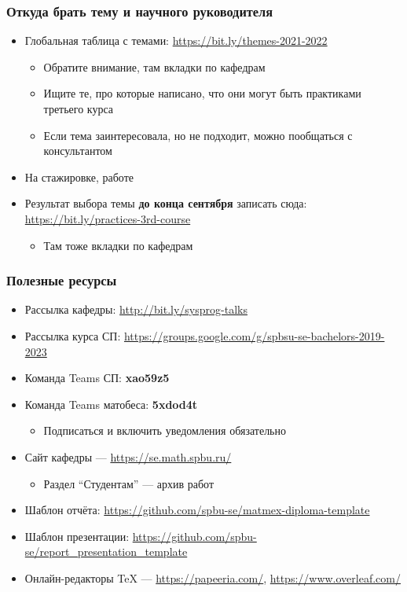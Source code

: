 \documentclass[xetex,mathserif,serif]{beamer}
\begin{document}
    \begin{frame}
        \frametitle{Откуда брать тему и научного руководителя}
        \begin{itemize}
            \item Глобальная таблица с темами: \url{https://bit.ly/themes-2021-2022}
            \begin{itemize}
                \item Обратите внимание, там вкладки по кафедрам
                \item Ищите те, про которые написано, что они могут быть практиками третьего курса
                \item Если тема заинтересовала, но не подходит, можно пообщаться с консультантом
            \end{itemize}
            \item На стажировке, работе
            \item Результат выбора темы \textbf{до конца сентября} записать сюда: \url{https://bit.ly/practices-3rd-course}
            \begin{itemize}
                \item Там тоже вкладки по кафедрам
            \end{itemize}
        \end{itemize}
    \end{frame}

    \begin{frame}
        \frametitle{Полезные ресурсы}
        \begin{itemize}
            \item Рассылка кафедры: \url{http://bit.ly/sysprog-talks}
            \item Рассылка курса СП: \url{https://groups.google.com/g/spbsu-se-bachelors-2019-2023}
            \item Команда Teams СП: \textbf{xao59z5}
            \item Команда Teams матобеса: \textbf{5xdod4t}
            \begin{itemize}
                \item Подписаться и включить уведомления обязательно
            \end{itemize}
            \item Сайт кафедры --- \url{https://se.math.spbu.ru/}
            \begin{itemize}
                \item Раздел ``Студентам'' --- архив работ
            \end{itemize}
            \item Шаблон отчёта: \url{https://github.com/spbu-se/matmex-diploma-template}
            \item Шаблон презентации: \url{https://github.com/spbu-se/report_presentation_template}
            \item Онлайн-редакторы TeX --- \url{https://papeeria.com/}, \url{https://www.overleaf.com/}
        \end{itemize}
    \end{frame}
\end{document}
